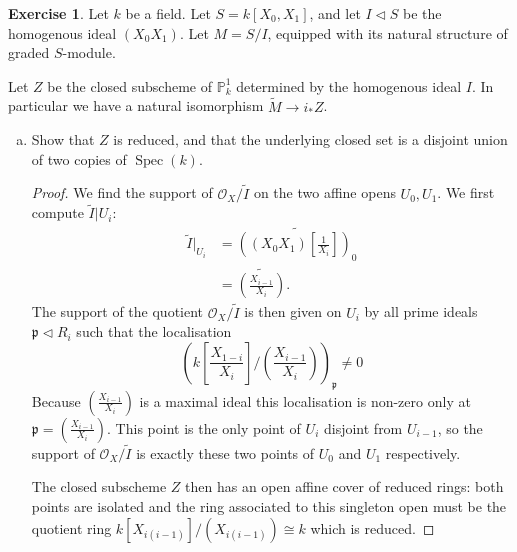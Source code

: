\documentclass{article}
\newcommand{\proj}{\mathbb{P}}
\newcommand{\sheaf}{\mathcal{O}}
\newcommand{\primeid}{\mathfrak{p}}
\DeclareMathOperator{\spec}{Spec}
\newcommand{\ideal}{\triangleleft}
\theoremstyle{definition}
\newtheorem{question}{Exercise}
\begin{document}
\begin{question}
    Let \(k\) be a field. Let \(S=k[X_{0},X_{1}]\), and
    let \(I\ideal S\) be the homogenous ideal \((X_{0}X_{1})\). Let
    \(M=S/I\), equipped with its natural structure of graded \(S\)-module.

    Let \(Z\) be the closed subscheme of \(\proj^{1}_{k}\) determined by the
    homogenous ideal \(I\). In particular we have a natural isomorphism
    \(\tilde{M}\to i_{*}Z\).
    \begin{enumerate}[(a)]
        \item Show that \(Z\) is reduced, and that the underlying closed set is
              a disjoint union of two copies of \(\spec(k)\).

              \begin{proof}
                  We find the support of \(\sheaf_{X}/\tilde{I}\) on the two
                  affine opens \(U_{0},U_{1}\). We first compute
                  \(\tilde{I}|U_{i}\):
                  \begin{align*}
                      \tilde{I}|_{U_{i}} & =\widetilde{\left((X_{0}X_{1})\left[\frac{1}{X_{i}}\right]\right)_{0}} \\
                                         & =\widetilde{\left(\frac{X_{i-1}}{X_{i}}\right)}.
                  \end{align*}
                  The support of the quotient \(\sheaf_{X}/\tilde{I}\) is then
                  given on \(U_{i}\) by all prime ideals \(\primeid\ideal
                  R_{i}\) such that the localisation
                  \[
                      \left(k\left[\frac{X_{1-i}}{X_{i}}\right]/\left(\frac{X_{i-1}}{X_{i}}\right)\right)_{\primeid}\neq 0
                  \]
                  Because \(\left(\frac{X_{i-1}}{X_{i}}\right)\) is a maximal
                  ideal this localisation is non-zero only at
                  \(\primeid=\left(\frac{X_{i-1}}{X_{i}}\right)\). This point is
                  the only point of \(U_{i}\) disjoint from \(U_{i-1}\), so the
                  support of \(\sheaf_{X}/\tilde{I}\) is exactly these two
                  points of \(U_{0}\) and \(U_{1}\) respectively.

                  The closed subscheme \(Z\) then has an open affine cover of
                  reduced rings: both points are isolated and the ring
                  associated to this singleton open must be the quotient ring
                  \(k[X_{i(i-1)}]/(X_{i(i-1)})\cong k\) which is reduced.


\end{proof}
\end{enumerate}
\end{question}
\end{document}
